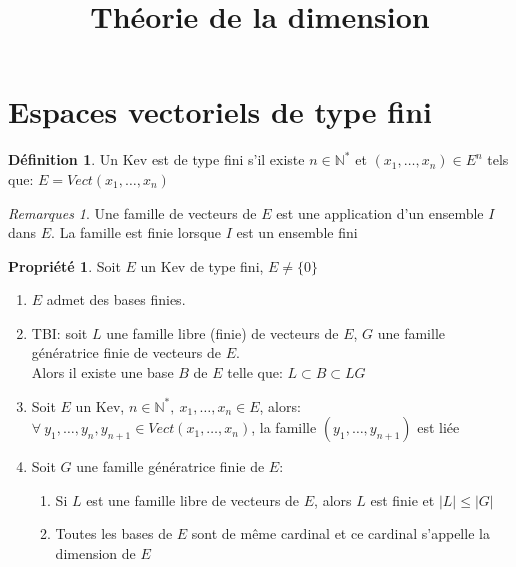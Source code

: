 \documentclass[fleqn]{article}
\title{Th\'eorie de la dimension}
\date{}
\theoremstyle{definition} \newtheorem*{defi}{D\'efinition}
\theoremstyle{definition} \newtheorem*{theo}{Th\'eor\`eme}
\theoremstyle{definition} \newtheorem*{coro}{Corollaire}
\theoremstyle{definition} \newtheorem*{nota}{Notation}
\theoremstyle{remark} \newtheorem*{rqs}{Remarques}
\theoremstyle{definition} \newtheorem*{prop}{Propri\'et\'e}
\begin{document}
\maketitle

\section{Espaces vectoriels de type fini}
\begin{defi}
	Un Kev est de type fini s'il existe $n \in \mathbb{N}^*$ et $(x_1, \hdots,  x_n) \in E^n$ tels que: $E = Vect(x_1, \hdots, x_n)$
\end{defi}

\begin{rqs}
	Une famille de vecteurs de $E$ est une application d'un ensemble $I$ dans $E$. La famille est finie lorsque $I$ est un ensemble fini
\end{rqs}

\begin{prop} Soit $E$ un Kev de type fini, $E \neq \{0\}$
	\begin{enumerate}
		\item $E$ admet des bases finies.
		\item TBI: soit $L$ une famille libre (finie) de vecteurs de $E$, $G$ une famille g\'en\'eratrice finie de vecteurs de $E$.\\
			Alors il existe une base $B$ de $E$ telle que: $L \subset B \subset LG$
		\item Soit $E$ un Kev, $n \in \mathbb{N}^*,\ x_1, \hdots, x_n \in E$, alors: \\
			$\forall\ y_1, \hdots, y_n, y_{n+1} \in Vect(x_1, \hdots, x_n)$, la famille $(y_1, \hdots, y_{n+1})$ est li\'ee
		\item Soit $G$ une famille g\'en\'eratrice finie de $E$:
			\begin{enumerate}
				\item Si $L$ est une famille libre de vecteurs de $E$, alors $L$ est finie et $|L| \leq |G|$
				\item Toutes les bases de $E$ sont de m\^eme cardinal et ce cardinal s'appelle la dimension de $E$
			\end{enumerate}
	\end{enumerate}
\end{prop}
\end{document}
